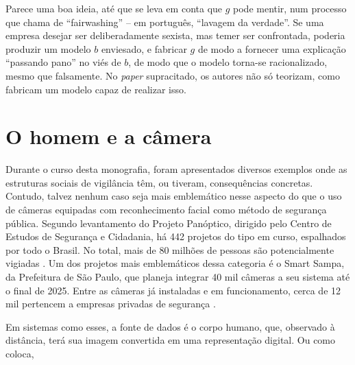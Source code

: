 Parece uma boa ideia, até que se leva em conta que $g$ pode mentir, num processo que \textcite{aïvodji_fairwashing_2019} chama de ``fairwashing'' -- em português, ``lavagem da verdade''.
Se uma empresa desejar ser deliberadamente sexista, mas temer ser confrontada, poderia produzir um modelo $b$ enviesado, e fabricar $g$ de modo a fornecer uma explicação ``passando pano'' no viés de $b$, de modo que o modelo torna-se racionalizado, mesmo que falsamente.
No \textit{paper} supracitado, os autores não só teorizam, como fabricam um modelo capaz de realizar isso.

\section{O homem e a câmera}
Durante o curso desta monografia, foram apresentados diversos exemplos onde as estruturas sociais de vigilância têm, ou tiveram, consequências concretas.
Contudo, talvez nenhum caso seja mais emblemático nesse aspecto do que o uso de câmeras equipadas com reconhecimento facial como método de segurança pública.
Segundo levantamento do Projeto Panóptico, dirigido pelo Centro de Estudos de Segurança e Cidadania, há 442 projetos do tipo em curso, espalhados por todo o Brasil.
No total, mais de 80 milhões de pessoas são potencialmente vigiadas \cite{centrodeestudosdesegurançaecidadania_panoptico_}.
Um dos projetos mais emblemáticos dessa categoria é o Smart Sampa, da Prefeitura de São Paulo, que planeja integrar 40 mil câmeras a seu sistema até o final de 2025.
Entre as câmeras já instaladas e em funcionamento, cerca de 12 mil pertencem a empresas privadas de segurança \cite{palhares_prefeitura_2025}.

Em sistemas como esses, a fonte de dados é o corpo humano, que, observado à distância, terá sua imagem convertida em uma representação digital.
Ou como \textcite[p.~160, tradução~própria]{dubbeld_observing_2003} coloca,

